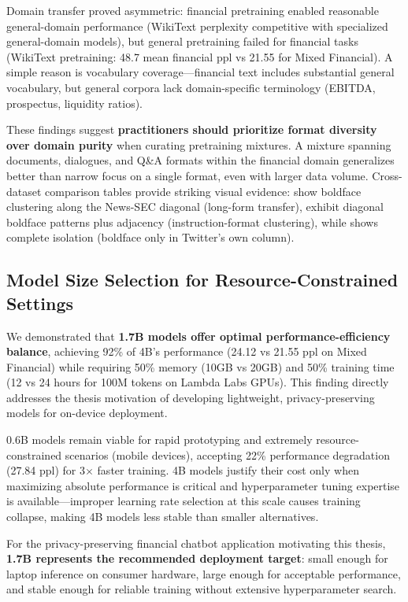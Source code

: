 Domain transfer proved asymmetric: financial pretraining enabled reasonable general-domain performance (WikiText perplexity competitive with specialized general-domain models), but general pretraining failed for financial tasks (WikiText pretraining: 48.7 mean financial ppl vs 21.55 for Mixed Financial). A simple reason is vocabulary coverage—financial text includes substantial general vocabulary, but general corpora lack domain-specific terminology (EBITDA, prospectus, liquidity ratios).

These findings suggest \textbf{practitioners should prioritize format diversity over domain purity} when curating pretraining mixtures. A mixture spanning documents, dialogues, and Q\&A formats within the financial domain generalizes better than narrow focus on a single format, even with larger data volume. Cross-dataset comparison tables provide striking visual evidence:  show boldface clustering along the News-SEC diagonal (long-form transfer),  exhibit diagonal boldface patterns plus adjacency (instruction-format clustering), while  shows complete isolation (boldface only in Twitter's own column).

\subsection{Model Size Selection for Resource-Constrained Settings}

We demonstrated that \textbf{1.7B models offer optimal performance-efficiency balance}, achieving 92\% of 4B's performance (24.12 vs 21.55 ppl on Mixed Financial) while requiring 50\% memory (10GB vs 20GB) and 50\% training time (12 vs 24 hours for 100M tokens on Lambda Labs GPUs). This finding directly addresses the thesis motivation of developing lightweight, privacy-preserving models for on-device deployment.

0.6B models remain viable for rapid prototyping and extremely resource-constrained scenarios (mobile devices), accepting 22\% performance degradation (27.84 ppl) for 3$\times$ faster training. 4B models justify their cost only when maximizing absolute performance is critical and hyperparameter tuning expertise is available—improper learning rate selection at this scale causes training collapse, making 4B models less stable than smaller alternatives.

For the privacy-preserving financial chatbot application motivating this thesis, \textbf{1.7B represents the recommended deployment target}: small enough for laptop inference on consumer hardware, large enough for acceptable performance, and stable enough for reliable training without extensive hyperparameter search.

